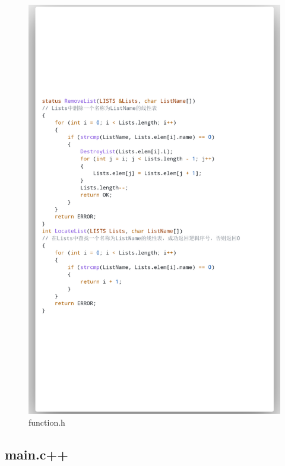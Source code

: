 \documentclass[supercite]{Experimental_Report}
\theoremstyle{definition}
\begin{document}
\begin{figure}[htb]
	\begin{center}
		\includegraphics[scale=0.30]{images/3-8.png}
		\caption{function.h}
		\label{fig3-8}
	\end{center}
\end{figure}

\subsection{main.c++}
\end{document}
